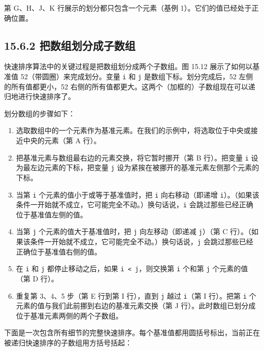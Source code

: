 第 G、H、J、K 行展示的划分都只包含一个元素（基例 1）。它们的值已经处于正确位置。


\subsection{15.6.2 把数组划分成子数组}

快速排序算法中的关键过程是把数组划分成两个子数组。图 15.12 展示了如何以基准值 52（带圆圈）来完成划分。变量 \texttt{i} 和 \texttt{j} 是数组下标。划分完成后，52 左侧的所有值都更小，52 右侧的所有值都更大。这两个（加框的）子数组现在可以递归地进行快速排序了。


划分数组的步骤如下：

\begin{enumerate}
\item 选取数组中的一个元素作为基准元素。在我们的示例中，将选取位于中央或接近中央的元素（第 A 行）。
\item 把基准元素与数组最右边的元素交换，将它暂时挪开（第 B 行）。把变量 \texttt{i} 设为最左边元素的下标，把变量 \texttt{j} 设为紧挨在被挪开的基准元素左侧那个元素的下标。
\item 当第 \texttt{i} 个元素的值小于或等于基准值时，把 \texttt{i} 向右移动（即递增 \texttt{i}）。（如果该条件一开始就不成立，它可能完全不动。）换句话说，\texttt{i} 会跳过那些已经正确位于基准值左侧的值。
\item 当第 \texttt{j} 个元素的值大于基准值时，把 \texttt{j} 向左移动（即递减 \texttt{j}）（第 C 行）。（如果该条件一开始就不成立，它可能完全不动。）换句话说，\texttt{j} 会跳过那些已经正确位于基准值右侧的值。
\item 在 \texttt{i} 和 \texttt{j} 都停止移动之后，如果 \texttt{i < j}，则交换第 \texttt{i} 个和第 \texttt{j} 个元素的值（第 D 行）。
\item 重复第 3、4、5 步（第 E 行到第 I 行），直到 \texttt{j} 越过 \texttt{i}（第 I 行）。把第 \texttt{i} 个元素的值与我们此前挪到右边的基准元素交换（第 J 行）。此时数组已划分成位于基准元素两侧的两个子数组。
\end{enumerate}

下面是一次包含所有细节的完整快速排序。每个基准值都用圆括号标出，当前正在被递归快速排序的子数组用方括号括起：

